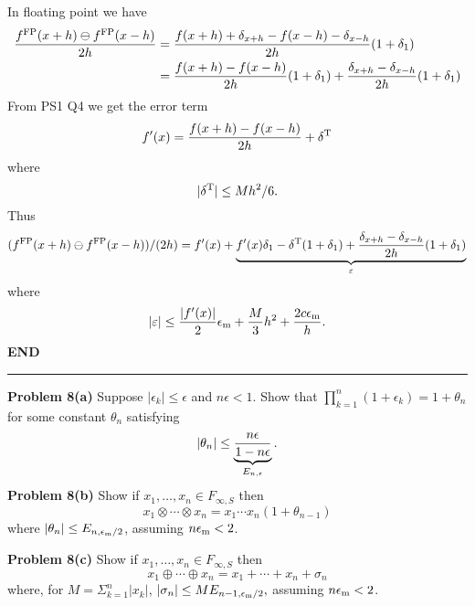 \documentclass[12pt,a4paper]{article}
\begin{document}
In floating point we have
\begin{align*}
{f^{\rm FP}(x + h) \ensuremath{\ominus} f^{\rm FP}(x-h) \over 2h} &= {f(x + h) +  \ensuremath{\delta}_{x+h} - f(x-h) - \ensuremath{\delta}_{x-h} \over 2h} (1 + \ensuremath{\delta}_1) \\
&= {f(x+h) - f(x-h) \over 2h} (1 + \ensuremath{\delta}_1) + {\ensuremath{\delta}_{x+h}- \ensuremath{\delta}_{x-h} \over 2h} (1 + \ensuremath{\delta}_1)
\end{align*}
From PS1 Q4 we get the error term
\[
f'(x) = {f(x + h) - f(x-h) \over 2h} + \ensuremath{\delta}^{\rm T}
\]
where
\[
|\ensuremath{\delta}^{\rm T}| \ensuremath{\leq} Mh^2/6.
\]
Thus
\[
(f^{\rm FP}(x + h) \ensuremath{\ominus} f^{\rm FP}(x-h)) / (2h) =
f'(x) + \underbrace{f'(x) \ensuremath{\delta}_1 - \ensuremath{\delta}^{\rm T} (1 + \ensuremath{\delta}_1) + {\ensuremath{\delta}_{x+h}- \ensuremath{\delta}_{x-h} \over 2h} (1 + \ensuremath{\delta}_1)}_{\ensuremath{\varepsilon}}
\]
where
\[
|\ensuremath{\varepsilon}| \ensuremath{\leq} {|f'(x)| \over 2} \ensuremath{\epsilon}_{\rm m} + {M \over 3} h^2 + {2 c \ensuremath{\epsilon}_{\rm m} \over h}.
\]
\textbf{END}

\rule{\textwidth}{1pt}
\textbf{Problem 8(a)} Suppose $|\ensuremath{\epsilon}_k| \ensuremath{\leq} \ensuremath{\epsilon}$ and $n \ensuremath{\epsilon} < 1$. Show that $\ensuremath{\prod}_{k=1}^n (1+\ensuremath{\epsilon}_k) = 1+\ensuremath{\theta}_n$ for some constant $\ensuremath{\theta}_n$ satisfying
\[
|\ensuremath{\theta}_n| \ensuremath{\leq} \underbrace{n \ensuremath{\epsilon} \over 1-n\ensuremath{\epsilon}}_{E_{n,\ensuremath{\epsilon}}}.
\]
\textbf{Problem 8(b)} Show if $x_1,\ensuremath{\ldots},x_n \ensuremath{\in} F_{\ensuremath{\infty},S}$ then
\[
x_1 \ensuremath{\otimes} \ensuremath{\cdots} \ensuremath{\otimes} x_n = x_1 \ensuremath{\cdots} x_n (1 + \ensuremath{\theta}_{n-1})
\]
where $|\ensuremath{\theta}_n| \ensuremath{\leq} E_{n,\ensuremath{\epsilon}_{\rm m}/2}$, assuming $n \ensuremath{\epsilon}_{\rm m} < 2$.

\textbf{Problem 8(c)} Show if $x_1,\ensuremath{\ldots},x_n \ensuremath{\in} F_{\ensuremath{\infty},S}$ then
\[
x_1 \ensuremath{\oplus} \ensuremath{\cdots} \ensuremath{\oplus} x_n = x_1 +  \ensuremath{\cdots} + x_n + \ensuremath{\sigma}_n
\]
where, for $M = \ensuremath{\Sigma}_{k=1}^n |x_k|$, $|\ensuremath{\sigma}_n| \ensuremath{\leq} M E_{n-1,\ensuremath{\epsilon}_{\rm m}/2},$ assuming $n \ensuremath{\epsilon}_{\rm m} < 2$.
\end{document}
